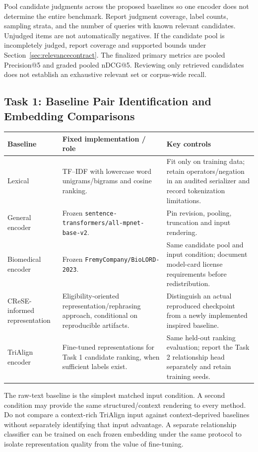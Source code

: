 \documentclass[10pt,letterpaper]{article}
\newcommand{\pathcode}[1]{\nolinkurl{#1}}
\begin{document}
Pool candidate judgments across the proposed baselines so one encoder does
not determine the entire benchmark. Report judgment coverage, label counts,
sampling strata, and the number of queries with known relevant candidates.
Unjudged items are not automatically negatives. If the candidate pool is
incompletely judged, report coverage and supported bounds under
Section~\ref{sec:relevancecontract}. The finalized primary metrics are pooled
Precision@5 and graded pooled nDCG@5. Reviewing only retrieved candidates
does not establish an exhaustive relevant set or corpus-wide recall.

\subsection{Task 1: Baseline Pair Identification and Embedding Comparisons}
\label{sec:baselines}
\begin{longtable}{L{.22\linewidth}L{.37\linewidth}L{.32\linewidth}}
\toprule Baseline & Fixed implementation / role & Key controls\\\midrule
\endhead
Lexical & TF--IDF with lowercase word unigrams/bigrams and cosine ranking. & Fit only on training data; retain operators/negation in an audited serializer and record tokenization limitations.\\
General encoder & Frozen \pathcode{sentence-transformers/all-mpnet-base-v2}. & Pin revision, pooling, truncation and input rendering.\\
Biomedical encoder & Frozen \pathcode{FremyCompany/BioLORD-2023}. & Same candidate pool and input condition; document model-card license requirements before redistribution.\\
CReSE-informed representation & Eligibility-oriented representation/rephrasing approach, conditional on reproducible artifacts. & Distinguish an actual reproduced checkpoint from a newly implemented inspired baseline.\\
TriAlign encoder & Fine-tuned representations for Task 1 candidate ranking, when sufficient labels exist. & Same held-out ranking evaluation; report the Task 2 relationship head separately and retain training seeds.\\\bottomrule
\end{longtable}

The raw-text baseline is the simplest matched input condition. A second
condition may provide the same structured/context rendering to every method.
Do not compare a context-rich TriAlign input against context-deprived baselines
without separately identifying that input advantage. A separate relationship
classifier can be trained on each frozen embedding under the same protocol
to isolate representation quality from the value of fine-tuning.
\end{document}
